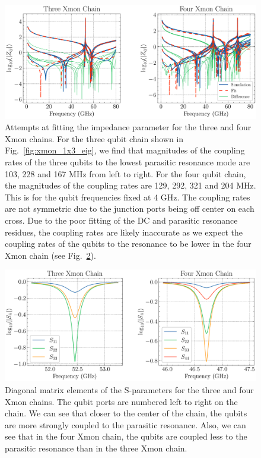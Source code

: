 \begin{figure}[h!]
    \centering
    \includegraphics[width=\textwidth]{figures/xmon_chain_fitting.pdf}
    \caption{Attempts at fitting the impedance parameter for the three and four Xmon chains. For the three qubit chain shown in Fig.\ \ref{fig:xmon_1x3_eig}, we find that magnitudes of the coupling rates of the three qubits to the lowest parasitic resonance mode are 103, 228 and 167 MHz from left to right. For the four qubit chain, the magnitudes of the coupling rates are 129, 292, 321 and 204 MHz. This is for the qubit frequencies fixed at 4 GHz. The coupling rates are not symmetric due to the junction ports being off center on each cross. Due to the poor fitting of the DC and parasitic resonance residues, the coupling rates are likely inaccurate as we expect the coupling rates of the qubits to the resonance to be lower in the four Xmon chain (see Fig.\ \ref{fig:xmon_3_4_S}).}
    \label{fig:xmon_3_4_fit}
\end{figure}

\newpage

\begin{figure}[!ht]
    \centering
    \includegraphics[width=\textwidth]{figures/xmon_chain_S.pdf}
    \caption{Diagonal matrix elements of the S-parameters for the three and four Xmon chains. The qubit ports are numbered left to right on the chain. We can see that closer to the center of the chain, the qubits are more strongly coupled to the parasitic resonance. Also, we can see that in the four Xmon chain, the qubits are coupled less to the parasitic resonance than in the three Xmon chain.}
    \label{fig:xmon_3_4_S}
\end{figure}

